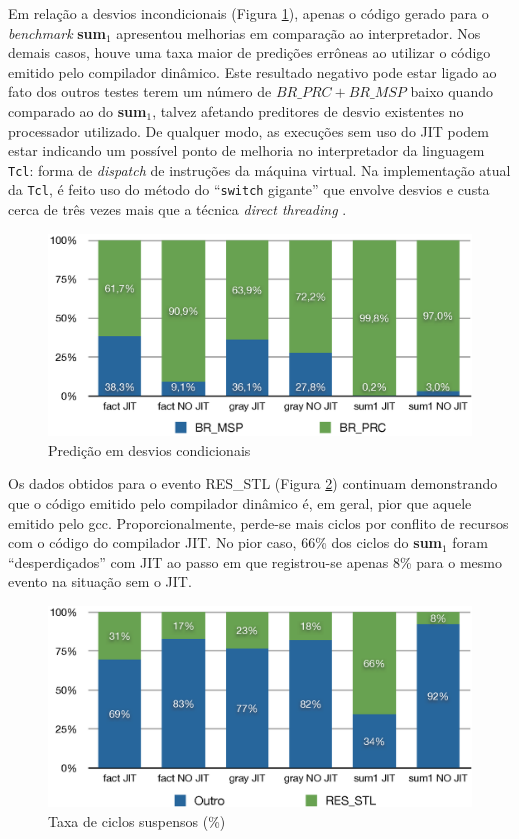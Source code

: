 Em relação a desvios incondicionais (Figura \ref{fig:branch}), apenas o
código gerado para o
\textit{benchmark} \textbf{sum$_1$} apresentou melhorias em comparação ao
interpretador. Nos demais casos, houve uma taxa maior de predições
errôneas ao utilizar o código emitido pelo compilador dinâmico. Este
resultado negativo pode estar ligado ao fato dos outros testes terem
um número de $BR\_PRC + BR\_MSP$ baixo quando comparado ao do
\textbf{sum$_1$}, talvez afetando preditores de desvio existentes no
processador utilizado. De qualquer modo, as execuções sem uso do JIT
podem estar indicando um possível ponto de melhoria no interpretador
da linguagem \texttt{Tcl}: forma de \textit{dispatch} de instruções da
máquina virtual. Na implementação atual da \texttt{Tcl}, é feito uso
do método do ``\verb!switch! gigante'' \cite{vmdispatch} que envolve
desvios e custa cerca
de três vezes mais que a técnica \textit{direct threading}
\cite{vmdispatch}.

\begin{figure}[ht!]
  \centering
  \includegraphics[scale=0.70]{figs/branching}
  \caption{Predição em desvios condicionais \label{fig:branch}}
\end{figure}

Os dados obtidos para o evento RES\_STL (Figura \ref{fig:stalled})
continuam demonstrando que o código
emitido pelo compilador dinâmico é, em geral, pior que aquele emitido pelo gcc.
Proporcionalmente, perde-se mais ciclos por conflito de recursos com o
código do compilador JIT. No pior caso, 66\% dos ciclos do
\textbf{sum$_1$} foram ``desperdiçados'' com JIT ao passo em que
registrou-se apenas 8\% para o mesmo evento na situação sem o JIT.

\begin{figure}[ht!]
  \centering
  \includegraphics[scale=0.70]{figs/cyclestall}
  \caption{Taxa de ciclos suspensos (\%) \label{fig:stalled}}
\end{figure}

